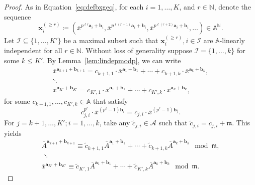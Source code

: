 \documentclass[10pt,a4paper]{amsart}
\newcommand{\A}{\mathbb{A}}
\newcommand{\N}{\mathbb{N}}
\newcommand{\ba}{\boldsymbol{a}}
\newcommand{\bb}{\boldsymbol{b}}
\newcommand{\bx}{\boldsymbol{x}}
\newcommand{\frm}{\mathfrak{m}}
\newcommand{\mA}{\mathcal{A}}
\newcommand{\mI}{\mathcal{I}}
\newcommand{\oA}{\overline{A}}
\newcommand{\ox}{\overline{x}}
\newcommand{\tc}{\widetilde{c}}
\begin{document}
\begin{proof}
    As in Equation~\eqref{eq:defbxgeq}, for each $i = 1, \ldots, K$, and $r \in \N$, denote the sequence
    \[
    \bx_i^{(\geq r)} \coloneqq (\ox^{p^{\ell r} \ba_i + \bb_i}, \ox^{p^{\ell (r+1)} \ba_i + \bb_i}, \ox^{p^{\ell (r+2)} \ba_i + \bb_i}, \ldots) \in \A^{\N}.
    \]
    Let $\mI \subseteq \{1, \ldots, K'\}$ be a maximal subset such that $\bx_i^{(\geq r)}, i \in \mI$ are $\A$-linearly independent for all $r \in \N$.
    Without loss of generality suppose $\mI = \{1, \ldots, k\}$ for some $k \leq K'$.
    By Lemma~\ref{lem:lindepmodp}, we can write
    \begin{multline*}
    \ox^{\ba_{k+1} + \bb_{k+1}} = c_{k+1,1} \cdot \ox^{\ba_1 + \bb_1} + \cdots + c_{k+1,k} \cdot \ox^{\ba_k + \bb_k}, \\
    \ddots \\
    \ox^{\ba_{K'} + \bb_{K'}} = c_{K',1} \cdot \ox^{\ba_1 + \bb_1} + \cdots + c_{K',k} \cdot \ox^{\ba_k + \bb_k},
    \end{multline*}
    for some $c_{k+1, 1}, \ldots, c_{K', k} \in \A$ that satisfy
    \begin{equation}\label{eq:condc}
    c_{j,i}^{p^{\ell}} \cdot \ox^{(p^{\ell} - 1) \bb_i} = c_{j,i} \cdot \ox^{(p^{\ell}-1)\bb_j}.
    \end{equation}
    For $j = k+1, \ldots, K'; i = 1, \ldots, k$, take any $\tc_{j, i} \in \mA$ such that $\tc_{j, i} = c_{j, i} + \frm$.
    This yields
    \begin{multline*}
    \oA^{\ba_{k+1} + \bb_{k+1}} \equiv \tc_{k+1,1} \oA^{\ba_1 + \bb_1} + \cdots + \tc_{k+1,k} \oA^{\ba_k + \bb_k} \mod \frm, \\\;\ddots\; \\
    \ox^{\ba_{K'} + \bb_{K'}} \equiv \tc_{K',1} \oA^{\ba_1 + \bb_1} + \cdots + \tc_{K',k} \oA^{\ba_k + \bb_k} \mod \frm.
    \end{multline*}
    

\end{proof}
\end{document}
